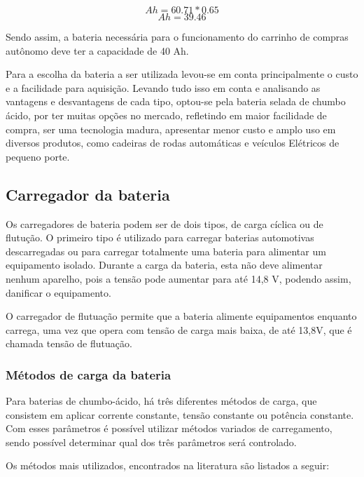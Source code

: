 $$ Ah= 60.71*0.65$$
$$ Ah=39.46 $$


\par Sendo assim, a bateria necessária para o funcionamento do carrinho de compras autônomo deve ter a capacidade de 40 Ah. 
\par Para a escolha da bateria a ser utilizada levou-se em conta principalmente o custo e a facilidade para aquisição. Levando tudo isso em conta e analisando as vantagens e desvantagens de cada tipo, optou-se pela bateria selada de chumbo ácido, por ter muitas opções no mercado, refletindo em maior facilidade de compra, ser uma tecnologia madura, apresentar menor custo e amplo uso em diversos produtos, como cadeiras de rodas automáticas e veículos Elétricos de pequeno porte.

\subsection{Carregador da bateria}

\par Os carregadores de bateria podem ser de dois tipos, de carga cíclica ou de flutução. O primeiro tipo é utilizado para carregar baterias automotivas descarregadas ou para carregar totalmente uma bateria para alimentar um equipamento isolado. Durante a carga da bateria, esta não deve alimentar nenhum aparelho, pois a tensão pode aumentar para até 14,8 V, podendo assim, danificar o equipamento.
\par O carregador de flutuação permite que a bateria alimente equipamentos enquanto carrega, uma vez que opera com tensão de carga mais baixa, de até 13,8V, que é chamada tensão de flutuação. 

\subsubsection{Métodos de carga da bateria}
\par Para baterias de chumbo-ácido, há três diferentes métodos de carga, que consistem em aplicar corrente constante, tensão constante ou potência constante. Com esses parâmetros é possível utilizar métodos variados de carregamento, sendo possível determinar qual dos três parâmetros será controlado.
\par Os métodos mais utilizados, encontrados na literatura são listados a seguir:

